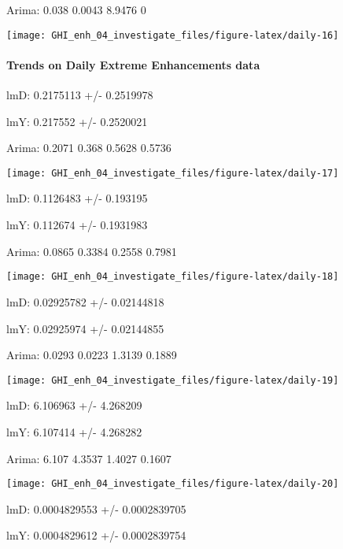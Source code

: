 \documentclass[
  10pt,
  a4paper,oneside]{article}
\begin{document}
Arima: 0.038 0.0043 8.9476 0

\begin{center}\texttt{[image: GHI\_enh\_04\_investigate\_files/figure-latex/daily-16]} \end{center}

\newpage

\hypertarget{trends-on-daily-extreme-enhancements-data}{%
\paragraph{Trends on Daily Extreme Enhancements data}\label{trends-on-daily-extreme-enhancements-data}}

lmD: 0.2175113 +/- 0.2519978

lmY: 0.217552 +/- 0.2520021

Arima: 0.2071 0.368 0.5628 0.5736

\begin{center}\texttt{[image: GHI\_enh\_04\_investigate\_files/figure-latex/daily-17]} \end{center}

lmD: 0.1126483 +/- 0.193195

lmY: 0.112674 +/- 0.1931983

Arima: 0.0865 0.3384 0.2558 0.7981

\begin{center}\texttt{[image: GHI\_enh\_04\_investigate\_files/figure-latex/daily-18]} \end{center}

lmD: 0.02925782 +/- 0.02144818

lmY: 0.02925974 +/- 0.02144855

Arima: 0.0293 0.0223 1.3139 0.1889

\begin{center}\texttt{[image: GHI\_enh\_04\_investigate\_files/figure-latex/daily-19]} \end{center}

lmD: 6.106963 +/- 4.268209

lmY: 6.107414 +/- 4.268282

Arima: 6.107 4.3537 1.4027 0.1607

\begin{center}\texttt{[image: GHI\_enh\_04\_investigate\_files/figure-latex/daily-20]} \end{center}

lmD: 0.0004829553 +/- 0.0002839705

lmY: 0.0004829612 +/- 0.0002839754
\end{document}
